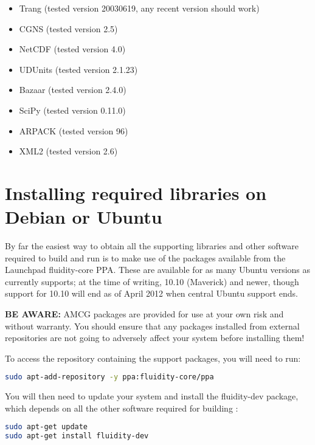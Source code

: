 \begin{itemize}
\item Trang (tested version 20030619, any recent version should work)
\item CGNS (tested version 2.5)
\item NetCDF (tested version 4.0)
\item UDUnits (tested version 2.1.23)
\item Bazaar (tested version 2.4.0)
\item SciPy (tested version 0.11.0)
\item ARPACK (tested version 96)
\item XML2 (tested version 2.6)
\end{itemize}

\section{Installing required libraries on Debian or Ubuntu}
\label{sec:required_ḻibraries_debian}

By far the easiest way to obtain all the supporting libraries and other
software required to build and run \fluidity is to make use of the \fluidity
packages available from the Launchpad fluidity-core PPA. These are available
for as many Ubuntu versions as \fluidity currently supports; at the time of
writing, 10.10 (Maverick) and newer, though support for 10.10 will end as of
April 2012 when central Ubuntu support ends.

\textbf{BE AWARE:} AMCG packages are provided for use at your own risk and
without warranty. You should ensure that any packages installed from external
repositories are not going to adversely affect your system before installing
them!

To access the repository containing the \fluidity support packages, you will
need to run:

\begin{lstlisting}[language=bash]
sudo apt-add-repository -y ppa:fluidity-core/ppa
\end{lstlisting}

You will then need to update your system and install the fluidity-dev package,
which depends on all the other software required for building \fluidity:

\begin{lstlisting}[language=bash]
sudo apt-get update
sudo apt-get install fluidity-dev
\end{lstlisting}

